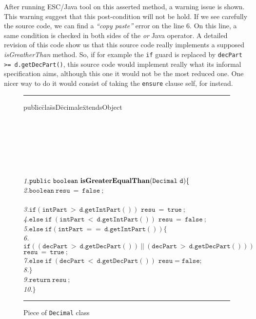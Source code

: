 \documentclass[a4paper]{llncs}
\begin{document}
After running ESC/Java tool on this asserted method, a warning
issue is shown. This warning suggest that this post-condition
will not be hold. If we see carefully the source
code, we can find a \emph{``copy paste''} error on the line $6$. On this
line, a same
condition is checked in both sides of the \emph{or} Java operator. A
detailed revision of this code show us that this source code really
implements a supposed \emph{isGreatherThan} method. So, if for example 
the \texttt{if} guard is replaced by \texttt{decPart >= d.getDecPart()}, this source
code would implement really what its informal specification aims,
although this one it would not be the most reduced one. One nicer
way to do it would consist of taking the \texttt{ensure} clause self,
for instead.
\begin{center}
\begin{figure}[hbt]
\rule{\linewidth}{0.3mm}
\rule{0em}{0.1ex}
\begin{tabbing}
pub\=lic\=cla\=ssD\=ecimale\=xtendsObject\kill

\>  \\
\>\> \\
\>\> \\
\>\> \\
\>\>\> \\
\>\>{\it */} \\
\emph{1.}\>\>$\mathtt{public\ boolean\ {\bf isGreaterEqualThan}(Decimal\ d)\{}$ \\
\emph{2.}\>\>\>$\mathtt{boolean\ resu\ =\ false\ ;}$ \\
\\
\emph{3.}\>\>\>$\mathtt{if(intPart\ >\ d.getIntPart())}$ $\mathtt{resu\ =\ true\ ;}$ \\
\emph{4.}\>\>\>$\mathtt{else\ if\ (intPart\ <\ d.getIntPart())}$ $\mathtt{resu\ =\ false\ ;}$ \\
\emph{5.}\>\>\>$\mathtt{else\ if(intPart\ ==\ d.getIntPart())\{} $        \\
\emph{6.}\>\>\>\>$\mathtt{if((decPart\ >\ d.getDecPart())\ ||\ (decPart\ >\
d.getDecPart()))}$ $\mathtt{resu\ =\ true\ ;}$ \\
\emph{7.}\>\>\>\>$\mathtt{else\ if\ (decPart\ <\ d.getDecPart())}$ $\mathtt{resu = false;}$ \\
\emph{8.}\>\>\>$\mathtt{\}}$ \\
\emph{9.}\>\>\>$\mathtt{return\ resu\ ;}$ \\
\emph{10.}\>\>$\mathtt{\}}$
\end{tabbing}
\caption{Piece of {\tt Decimal} class}
\label{fig-cla-dec}
\rule{\linewidth}{0.3mm}
\end{figure}
\end{center}
\end{document}
